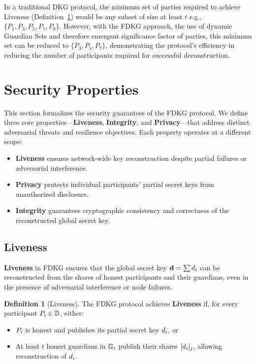 \documentclass[lettersize,journal]{IEEEtran}
\theoremstyle{definition}
\newtheorem{definition}{Definition}
\begin{document}
In a traditional DKG protocol, the minimum set of parties required to achieve Liveness (Definition~\ref{def:liveness}) would be any subset of size at least $t$ e.g., \(\{P_1, P_3, P_5, P_7, P_9 \}\). However, with the FDKG approach, the use of dynamic Guardian Sets and therefore emergent significance factor of parties, this minimum set can be reduced to $\{P_3, P_5, P_7\}$, demonstrating the protocol's efficiency in reducing the number of participants required for successful deconstruction.

\section{Security Properties}
\label{sec:security_properties}

This section formalizes the security guarantees of the FDKG protocol. We define three core properties---\textbf{Liveness}, \textbf{Integrity}, and \textbf{Privacy}---that address distinct adversarial threats and resilience objectives. Each property operates at a different scope:
\begin{itemize}
    \item \textbf{Liveness} ensures network-wide key reconstruction despite partial failures or adversarial interference.
    \item \textbf{Privacy} protects individual participants' partial secret keys from unauthorized disclosure.
    \item \textbf{Integrity} guarantees cryptographic consistency and correctness of the reconstructed global secret key.
\end{itemize}

\subsection{Liveness}
\label{subsec:liveness}

\textbf{Liveness} in FDKG ensures that the global secret key \(\textbf{d} = \sum d_{i}\) can be reconstructed from the shares of honest participants and their guardians, even in the presence of adversarial interference or node failures.

\begin{definition}[Liveness]
\label{def:liveness}
The FDKG protocol achieves \textbf{Liveness} if, for every participant \(P_{i} \in \mathbb{D}\), either:
\begin{itemize}
    \item \(P_{i}\) is honest and publishes its partial secret key \(d_{i}\), or
    \item At least \(t\) honest guardians in \(\mathbb{G}_{i}\) publish their shares \([d_{i}]_{j}\), allowing reconstruction of \(d_{i}\).
\end{itemize}
\end{definition}
\end{document}
